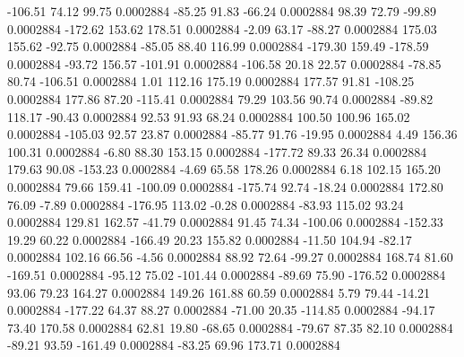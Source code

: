      -106.51       74.12       99.75     0.0002884
      -85.25       91.83      -66.24     0.0002884
       98.39       72.79      -99.89     0.0002884
     -172.62      153.62      178.51     0.0002884
       -2.09       63.17      -88.27     0.0002884
      175.03      155.62      -92.75     0.0002884
      -85.05       88.40      116.99     0.0002884
     -179.30      159.49     -178.59     0.0002884
      -93.72      156.57     -101.91     0.0002884
     -106.58       20.18       22.57     0.0002884
      -78.85       80.74     -106.51     0.0002884
        1.01      112.16      175.19     0.0002884
      177.57       91.81     -108.25     0.0002884
      177.86       87.20     -115.41     0.0002884
       79.29      103.56       90.74     0.0002884
      -89.82      118.17      -90.43     0.0002884
       92.53       91.93       68.24     0.0002884
      100.50      100.96      165.02     0.0002884
     -105.03       92.57       23.87     0.0002884
      -85.77       91.76      -19.95     0.0002884
        4.49      156.36      100.31     0.0002884
       -6.80       88.30      153.15     0.0002884
     -177.72       89.33       26.34     0.0002884
      179.63       90.08     -153.23     0.0002884
       -4.69       65.58      178.26     0.0002884
        6.18      102.15      165.20     0.0002884
       79.66      159.41     -100.09     0.0002884
     -175.74       92.74      -18.24     0.0002884
      172.80       76.09       -7.89     0.0002884
     -176.95      113.02       -0.28     0.0002884
      -83.93      115.02       93.24     0.0002884
      129.81      162.57      -41.79     0.0002884
       91.45       74.34     -100.06     0.0002884
     -152.33       19.29       60.22     0.0002884
     -166.49       20.23      155.82     0.0002884
      -11.50      104.94      -82.17     0.0002884
      102.16       66.56       -4.56     0.0002884
       88.92       72.64      -99.27     0.0002884
      168.74       81.60     -169.51     0.0002884
      -95.12       75.02     -101.44     0.0002884
      -89.69       75.90     -176.52     0.0002884
       93.06       79.23      164.27     0.0002884
      149.26      161.88       60.59     0.0002884
        5.79       79.44      -14.21     0.0002884
     -177.22       64.37       88.27     0.0002884
      -71.00       20.35     -114.85     0.0002884
      -94.17       73.40      170.58     0.0002884
       62.81       19.80      -68.65     0.0002884
      -79.67       87.35       82.10     0.0002884
      -89.21       93.59     -161.49     0.0002884
      -83.25       69.96      173.71     0.0002884
